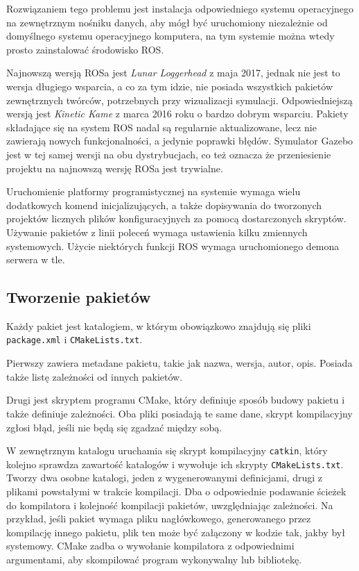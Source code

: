	Rozwiązaniem tego problemu jest instalacja odpowiedniego systemu operacyjnego na zewnętrznym nośniku danych, aby mógł być uruchomiony niezależnie od domyślnego 
	systemu operacyjnego komputera, na tym systemie można wtedy prosto zainstalować środowisko ROS.
	
	Najnowszą wersją ROSa jest \emph{Lunar Loggerhead} z maja 2017, jednak nie jest to wersja długiego wsparcia, a co za tym idzie, nie posiada wszystkich
	pakietów zewnętrznych twórców, potrzebnych przy wizualizacji symulacji.
	Odpowiedniejszą wersją jest \emph{Kinetic Kame} z marca 2016 roku o bardzo dobrym wsparciu.
	Pakiety składające się na system ROS nadal są regularnie aktualizowane, lecz nie zawierają nowych funkcjonalności, a jedynie poprawki błędów.
	Symulator Gazebo jest w tej samej wersji na obu dystrybucjach, co też oznacza że przeniesienie projektu na najnowszą wersję ROSa jest trywialne.

	Uruchomienie platformy programistycznej na systemie wymaga wielu dodatkowych komend inicjalizujących, 
	a także dopisywania do tworzonych projektów licznych plików konfiguracyjnych za pomocą dostarczonych skryptów.
	Używanie pakietów z linii poleceń wymaga ustawienia kilku zmiennych systemowych.
	Użycie niektórych funkcji ROS wymaga uruchomionego demona serwera w tle.
	
	\subsection{Tworzenie pakietów}
		Każdy pakiet jest katalogiem, w którym obowiązkowo znajdują się pliki \texttt{package.xml} i \texttt{CMakeLists.txt}.
		
		Pierwszy zawiera metadane pakietu, takie jak nazwa, wersja, autor, opis.
		Posiada także listę zależności od innych pakietów.
		
		Drugi jest skryptem programu CMake, który definiuje sposób budowy pakietu i także definiuje zależności.
		Oba pliki posiadają te same dane, skrypt kompilacyjny zgłosi błąd, jeśli nie będą się zgadzać między sobą.
		
		W zewnętrznym katalogu uruchamia się skrypt kompilacyjny \texttt{catkin}, który kolejno sprawdza zawartość katalogów i wywołuje ich skrypty \texttt{CMakeLists.txt}.
		Tworzy dwa osobne katalogi, jeden z wygenerowanymi definicjami, drugi z plikami powstałymi w trakcie kompilacji.
		Dba o odpowiednie podawanie ścieżek do kompilatora i kolejność kompilacji pakietów, uwzględniając zależności.
		Na przykład, jeśli pakiet wymaga pliku nagłówkowego, generowanego przez kompilację innego pakietu, plik ten może być załączony w kodzie tak, jakby był systemowy.
		CMake zadba o wywołanie kompilatora z odpowiednimi argumentami, aby skompilować program wykonywalny lub bibliotekę.
		
